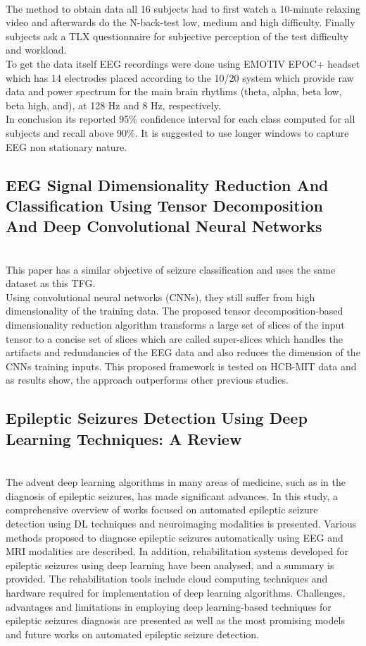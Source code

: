 \\
The method to obtain data all 16 subjects had to first watch a 10-minute relaxing video and afterwards do the N-back-test low, medium and high difficulty. Finally subjects ask a TLX questionnaire for subjective perception of the test difficulty and workload.
\\
To get the data itself EEG recordings were done using EMOTIV EPOC+ headset which has 14 electrodes placed according to the 10/20 system which provide raw data and power spectrum for the main brain rhythms (theta, alpha, beta low, beta high, and), at 128 Hz and 8 Hz, respectively. 
\\
In conclusion its reported 95\% confidence interval for each class computed for all subjects and recall above 90\%. It is suggested to use longer windows to capture EEG non stationary nature.
\leavevmode\\


\subsection{EEG Signal Dimensionality Reduction And Classification Using Tensor Decomposition And Deep Convolutional Neural Networks}
\leavevmode\\
This paper has a similar objective of seizure classification and uses the same dataset as this TFG.
\\
Using convolutional neural networks (CNNs), they still suffer from high dimensionality of the training data. The proposed tensor decomposition-based dimensionality reduction algorithm transforms a large set of slices of the input tensor to a concise set of slices which are called super-slices which handles the artifacts and redundancies of the EEG data and also reduces the dimension of the CNNs training inputs. This proposed framework is tested on HCB-MIT data and as results show, the approach outperforms other previous studies.
\\

\subsection{Epileptic Seizures Detection Using Deep Learning Techniques: A Review}
\leavevmode\\
The advent deep learning algorithms in many areas of medicine, such as in the diagnosis of epileptic seizures, has made significant advances. In this study, a comprehensive overview of works focused on automated epileptic seizure detection using DL techniques and neuroimaging modalities is presented. Various methods proposed to diagnose epileptic seizures automatically using EEG and MRI modalities are described. In addition, rehabilitation systems developed for epileptic seizures using deep learning have been analysed, and a summary is provided. The rehabilitation tools include cloud computing techniques and hardware required for implementation of deep learning algorithms. Challenges, advantages and limitations in employing deep learning-based techniques for epileptic seizures diagnosis are presented as well as the most promising models and future works on automated epileptic seizure detection.
\\

